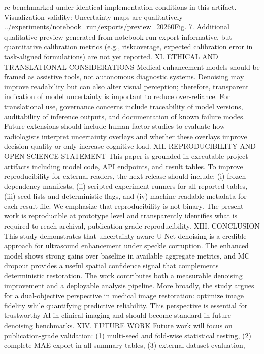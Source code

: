 re-benchmarked under identical implementation conditions in
this artifact.
Visualization validity: Uncertainty maps are qualitatively
../experiments/notebook_run/exports/preview_20260Fig. 7. Additional qualitative preview generated from notebook-run export
informative, but quantitative calibration metrics (e.g., riskcoverage, expected calibration error in task-aligned formulations) are not yet reported.
XI. ETHICAL AND TRANSLATIONAL CONSIDERATIONS
Medical enhancement models should be framed as assistive
tools, not autonomous diagnostic systems. Denoising may improve readability but can also alter visual perception; therefore,
transparent indication of model uncertainty is important to
reduce over-reliance.
For translational use, governance concerns include traceability of model versions, auditability of inference outputs,
and documentation of known failure modes. Future extensions
should include human-factor studies to evaluate how radiologists interpret uncertainty overlays and whether these overlays
improve decision quality or only increase cognitive load.
XII. REPRODUCIBILITY AND OPEN SCIENCE STATEMENT
This paper is grounded in executable project artifacts including model code, API endpoints, and result tables. To
improve reproducibility for external readers, the next release
should include: (i) frozen dependency manifests, (ii) scripted
experiment runners for all reported tables, (iii) seed lists and
deterministic flags, and (iv) machine-readable metadata for
each result file.
We emphasize that reproducibility is not binary. The present
work is reproducible at prototype level and transparently
identifies what is required to reach archival, publication-grade
reproducibility.
XIII. CONCLUSION
This study demonstrates that uncertainty-aware U-Net denoising is a credible approach for ultrasound enhancement
under speckle corruption. The enhanced model shows strong
gains over baseline in available aggregate metrics, and MC
dropout provides a useful spatial confidence signal that complements deterministic restoration. The work contributes both
a measurable denoising improvement and a deployable analysis pipeline.
More broadly, the study argues for a dual-objective perspective in medical image restoration: optimize image fidelity
while quantifying predictive reliability. This perspective is
essential for trustworthy AI in clinical imaging and should
become standard in future denoising benchmarks.
XIV. FUTURE WORK
Future work will focus on publication-grade validation: (1)
multi-seed and fold-wise statistical testing, (2) complete MAE
export in all summary tables, (3) external dataset evaluation,
